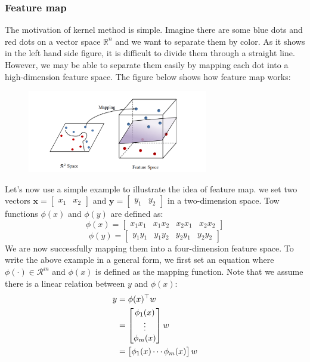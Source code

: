 \subsubsection{Feature map}
The motivation of kernel method is simple. Imagine there are some blue dots and red dots on a vector space $\mathbb{R}^n$ and 
we want to separate them by color. As it shows in the left hand side figure, it is difficult to divide them through a straight 
line. However, we may be able to separate them easily by mapping each dot into a high-dimension feature space. The figure below 
shows how feature map works:
\begin{figure}[H]
    \centering
    \includegraphics[width=0.7\textwidth]{Mapping}
\end{figure}
Let's now use a simple example to illustrate the idea of feature map. 
we set two vectors $\textbf{x}=\begin{bmatrix}x_1&x_2\end{bmatrix}$ and $\textbf{y}=\begin{bmatrix}y_1&y_2\end{bmatrix}$ in a two-dimension space.
Tow functions $\phi(x)$ and $\phi(y)$ are defined as:
\begin{equation*}
    \phi(x)=\begin{bmatrix}
        x_1x_1&x_1x_2&x_2x_1&x_2x_2
    \end{bmatrix}
\end{equation*}
\begin{equation*}
    \phi(y)=\begin{bmatrix}
        y_1y_1&y_1y_2&y_2y_1&y_2y_2
    \end{bmatrix}
\end{equation*}
We are now successfully mapping them into a four-dimension feature space. 
To write the above example in a general form, we first set an equation where $\phi(\cdot)\in\mathcal{R}^m$ and $\phi(x)$ is defined as the mapping function. Note that we assume there is a linear relation between $y$ and $\phi(x)$:
\begin{align}
    y&=\phi(x)^\top w \notag\\
     &= \begin{bmatrix}
        \phi_1(x) \\
        \vdots \\
        \phi_m(x)
        \end{bmatrix} w \notag\\
     &= \begin{bmatrix}
        \phi_1(x)\cdots\phi_m(x)
        \end{bmatrix} w
\end{align}
